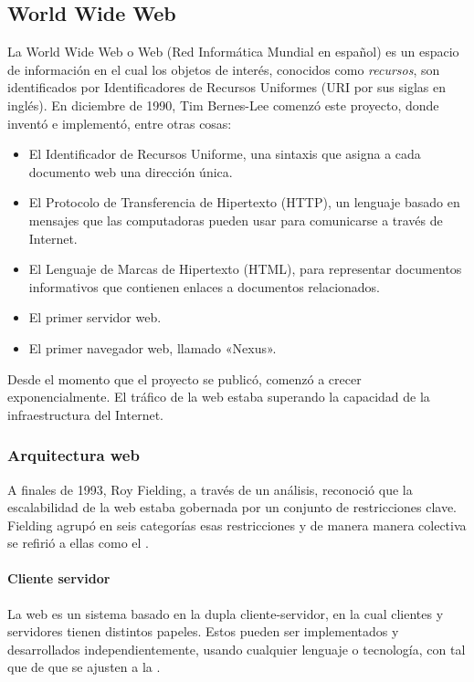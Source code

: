\begin{description}
\end{description}


\subsection{World Wide Web}
\label{\detokenize{chapter_one/rest:world-wide-web}}
La World Wide Web o Web (Red Informática Mundial en español)  es un espacio de
información en el cual los objetos de interés, conocidos como \textit{recursos},
son identificados por Identificadores de Recursos Uniformes (URI por sus
siglas en inglés). En diciembre de 1990, Tim Bernes-Lee comenzó este proyecto,
donde inventó e implementó, entre otras cosas:
\begin{itemize}
\item {} 
El Identificador de Recursos Uniforme, una sintaxis que asigna a cada documento web una dirección única.

\item {} 
El Protocolo de Transferencia de Hipertexto (HTTP), un lenguaje basado en mensajes que las computadoras pueden usar para comunicarse a través de Internet.

\item {} 
El Lenguaje de Marcas de Hipertexto (HTML), para representar documentos informativos que contienen enlaces a documentos relacionados.

\item {} 
El primer servidor web.

\item {} 
El primer navegador web, llamado «Nexus».

\end{itemize}

Desde el momento que el proyecto se publicó, comenzó a crecer exponencialmente.
El tráfico de la web estaba superando la capacidad de la infraestructura del Internet.


\subsubsection{Arquitectura web}
\label{\detokenize{chapter_one/rest:arquitectura-web}}
A finales de 1993, Roy Fielding, a través de un análisis, reconoció que la escalabilidad
de la web estaba gobernada por un conjunto de restricciones clave.
Fielding agrupó en seis categorías esas restricciones y de manera manera colectiva
se refirió a ellas como el .


\paragraph{Cliente servidor}
\label{\detokenize{chapter_one/rest:cliente-servidor}}
La web es un sistema basado en la dupla cliente-servidor, en la cual clientes y servidores
tienen distintos papeles. Estos pueden ser implementados y desarrollados independientemente,
usando cualquier lenguaje o tecnología, con tal que de que se ajusten a la .


